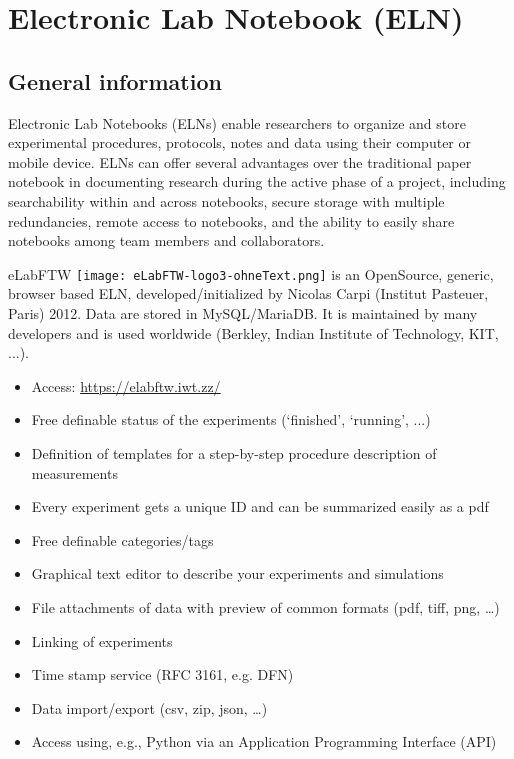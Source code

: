 \section[Electronic Lab Notebook]{Electronic Lab Notebook (ELN)}\label{ssc:ELN}


\subsection{General information}

Electronic Lab Notebooks (ELNs) enable researchers to organize and store
experimental procedures, protocols, notes and data using their computer or
mobile device. ELNs can offer several advantages over the traditional paper
notebook in documenting research during the active phase of a project, including
searchability within and across notebooks, secure storage with multiple
redundancies, remote access to notebooks, and the ability to easily share
notebooks among team members and collaborators.

eLabFTW \texttt{[image: eLabFTW-logo3-ohneText.png]} is an OpenSource, generic, browser based ELN, developed/initialized by
Nicolas Carpi (Institut Pasteuer, Paris) 2012. Data are stored in MySQL/MariaDB.
It is maintained by many developers and is used worldwide (Berkley, Indian
Institute of Technology, KIT, ...).
\begin{itemize}
  \item Access: \url{https://elabftw.iwt.zz/}
  \item Free definable status of the experiments (`finished', `running', ...)
  \item Definition of templates for a step-by-step procedure description of
        measurements
  \item Every experiment gets a unique ID and can be summarized easily as a pdf
  \item Free definable categories/tags
  \item Graphical text editor to describe your experiments and simulations
  \item File attachments of data with preview of common formats (pdf, tiff, png, …)
  \item Linking of experiments
  \item Time stamp service (RFC 3161, e.g. DFN)
  \item Data import/export (csv, zip, json, …)
  \item Access using, e.g., Python via an Application Programming Interface (API)
\end{itemize}


